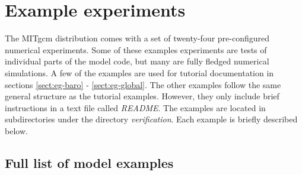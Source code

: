\section{Example experiments}
\label{sect:modelExamples}

The MITgcm distribution comes with a set of twenty-four pre-configured
numerical experiments. Some of these examples experiments are tests of 
individual parts of the model code, but many are fully fledged numerical
simulations. A few of the examples are used for tutorial documentation
in sections \ref{sect:eg-baro} - \ref{sect:eg-global}. The other examples
follow the same general structure as the tutorial examples. However,
they only include brief instructions in a text file called {\it README}.
The examples are located in subdirectories under
the directory \textit{verification}. Each
example is briefly described below.

\subsection{Full list of model examples}

